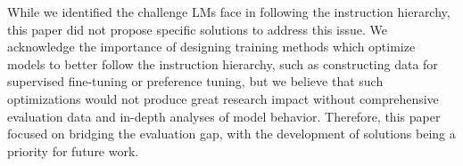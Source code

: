 While we identified the challenge LMs face in following the instruction hierarchy, this paper did not propose specific solutions to address this issue. We acknowledge the importance of designing training methods which optimize models to better follow the instruction hierarchy, such as constructing data for supervised fine-tuning or preference tuning, but we believe that such optimizations would not produce great research impact without comprehensive evaluation data and in-depth analyses of model behavior. Therefore, this paper focused on bridging the evaluation gap, with the development of solutions being a priority for future work.
